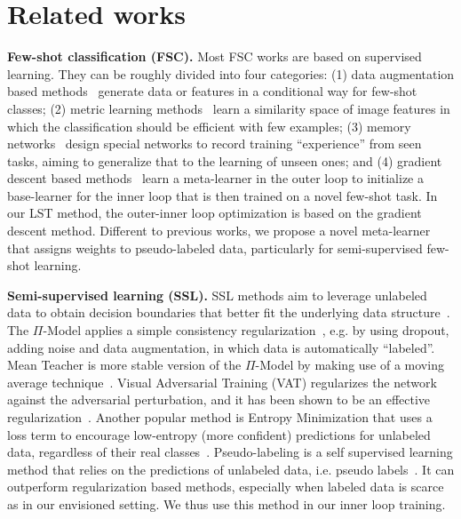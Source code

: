 \documentclass{article}
\newcommand{\myparagraph}[1]{\vspace{0.1em}\noindent\textbf{#1}}
\begin{document}
\section{Related works}
\myparagraph{Few-shot classification (FSC).}
Most FSC works are based on supervised learning. They can be roughly divided into four categories:
(1) data augmentation based methods~\cite{Mehrotra2017, SchwartzNIPS18, WangCVPR2018, XianCVPR2019a} generate data or features in a conditional way for few-shot classes;
(2) metric learning methods~\cite{VinyalsBLKW16, SnellSZ17, SungCVPR2018} learn a similarity space of image features in which the classification should be efficient with few examples;
(3) memory networks~\cite{MunkhdalaiICML2017, SantoroBBWL16, OreshkinNIPS18, MishraICLR2018} design special networks to record training ``experience'' from seen tasks, aiming to generalize that to the learning of unseen ones; 
and 
(4) gradient descent based methods~\cite{FinnAL17, FinnNIPS2018, AntoniouICLR19, RaviICLR2017, LeeICML18, GrantICLR2018, ZhangNIPS2018MetaGAN, SunCVPR2019}
learn a meta-learner in the outer loop to initialize a base-learner for the inner loop that is then trained on a novel few-shot task.
In our LST method, the outer-inner loop optimization is based on the gradient descent method. Different to previous works, we propose a novel meta-learner that assigns weights to pseudo-labeled data, particularly for semi-supervised few-shot learning.


\myparagraph{Semi-supervised learning (SSL).} 
SSL methods aim to leverage unlabeled data to obtain decision boundaries that better fit the underlying data structure~\cite{OliverNIPS18semi_survey}.
The $\Pi$-Model applies a simple consistency regularization~\cite{LaineICLR2017pi_model}, e.g. by using dropout, adding noise and data augmentation, in which data is automatically ``labeled''.
Mean Teacher is more stable version of the $\Pi$-Model by making use of a moving average technique~\cite{TarvainenNIPS17mean_teacher}.
Visual Adversarial Training (VAT) regularizes the network against the adversarial perturbation, and it has been shown to be an effective regularization~\cite{MiyatoDG16VAT}. 
Another popular method is Entropy Minimization that uses a loss term to encourage low-entropy (more confident) predictions for unlabeled data, regardless of their real classes~\cite{GrandvaletNIPS04_entmin}.
Pseudo-labeling is a self supervised learning method that relies on the predictions of unlabeled data, i.e. pseudo labels~\cite{Lee2013pseudo_label}.
It can outperform regularization based methods, especially when labeled data is scarce~\cite{OliverNIPS18semi_survey} as in our envisioned setting.
We thus use this method in our inner loop training.
\end{document}
